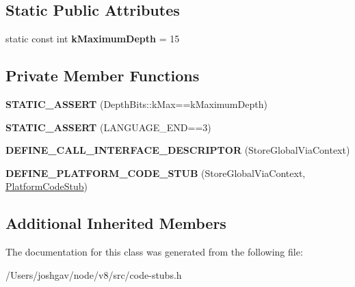 \subsection*{Static Public Attributes}
\begin{DoxyCompactItemize}
\item 
static const int {\bfseries k\+Maximum\+Depth} = 15\hypertarget{classv8_1_1internal_1_1_store_global_via_context_stub_aef77846cb49daca43f1e729c0f428e77}{}\label{classv8_1_1internal_1_1_store_global_via_context_stub_aef77846cb49daca43f1e729c0f428e77}

\end{DoxyCompactItemize}
\subsection*{Private Member Functions}
\begin{DoxyCompactItemize}
\item 
{\bfseries S\+T\+A\+T\+I\+C\+\_\+\+A\+S\+S\+E\+RT} (Depth\+Bits\+::k\+Max==k\+Maximum\+Depth)\hypertarget{classv8_1_1internal_1_1_store_global_via_context_stub_a59a04b5fd68a7854247131692fbce4ea}{}\label{classv8_1_1internal_1_1_store_global_via_context_stub_a59a04b5fd68a7854247131692fbce4ea}

\item 
{\bfseries S\+T\+A\+T\+I\+C\+\_\+\+A\+S\+S\+E\+RT} (L\+A\+N\+G\+U\+A\+G\+E\+\_\+\+E\+ND==3)\hypertarget{classv8_1_1internal_1_1_store_global_via_context_stub_aa658a8ecff41cafcfb6bbc952dd658a6}{}\label{classv8_1_1internal_1_1_store_global_via_context_stub_aa658a8ecff41cafcfb6bbc952dd658a6}

\item 
{\bfseries D\+E\+F\+I\+N\+E\+\_\+\+C\+A\+L\+L\+\_\+\+I\+N\+T\+E\+R\+F\+A\+C\+E\+\_\+\+D\+E\+S\+C\+R\+I\+P\+T\+OR} (Store\+Global\+Via\+Context)\hypertarget{classv8_1_1internal_1_1_store_global_via_context_stub_aa437206a0f8b496bfcd06bb8f32b073f}{}\label{classv8_1_1internal_1_1_store_global_via_context_stub_aa437206a0f8b496bfcd06bb8f32b073f}

\item 
{\bfseries D\+E\+F\+I\+N\+E\+\_\+\+P\+L\+A\+T\+F\+O\+R\+M\+\_\+\+C\+O\+D\+E\+\_\+\+S\+T\+UB} (Store\+Global\+Via\+Context, \hyperlink{classv8_1_1internal_1_1_platform_code_stub}{Platform\+Code\+Stub})\hypertarget{classv8_1_1internal_1_1_store_global_via_context_stub_a09852671db79c4065f50e78491c45e70}{}\label{classv8_1_1internal_1_1_store_global_via_context_stub_a09852671db79c4065f50e78491c45e70}

\end{DoxyCompactItemize}
\subsection*{Additional Inherited Members}


The documentation for this class was generated from the following file\+:\begin{DoxyCompactItemize}
\item 
/\+Users/joshgav/node/v8/src/code-\/stubs.\+h\end{DoxyCompactItemize}
